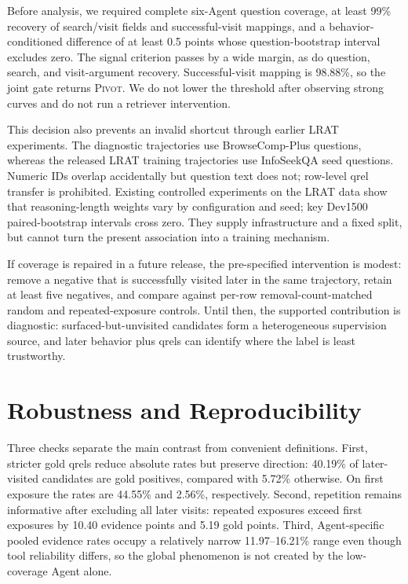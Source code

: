 Before analysis, we required complete six-Agent question coverage, at least 99\% recovery of search/visit fields and successful-visit mappings, and a behavior-conditioned difference of at least 0.5 points whose question-bootstrap interval excludes zero. The signal criterion passes by a wide margin, as do question, search, and visit-argument recovery. Successful-visit mapping is 98.88\%, so the joint gate returns \textsc{Pivot}. We do not lower the threshold after observing strong curves and do not run a retriever intervention.

This decision also prevents an invalid shortcut through earlier LRAT experiments. The diagnostic trajectories use BrowseComp-Plus questions, whereas the released LRAT training trajectories use InfoSeekQA seed questions. Numeric IDs overlap accidentally but question text does not; row-level qrel transfer is prohibited. Existing controlled experiments on the LRAT data show that reasoning-length weights vary by configuration and seed; key Dev1500 paired-bootstrap intervals cross zero. They supply infrastructure and a fixed split, but cannot turn the present association into a training mechanism.

If coverage is repaired in a future release, the pre-specified intervention is modest: remove a negative that is successfully visited later in the same trajectory, retain at least five negatives, and compare against per-row removal-count-matched random and repeated-exposure controls. Until then, the supported contribution is diagnostic: surfaced-but-unvisited candidates form a heterogeneous supervision source, and later behavior plus qrels can identify where the label is least trustworthy.

\section{Robustness and Reproducibility}

Three checks separate the main contrast from convenient definitions. First, stricter gold qrels reduce absolute rates but preserve direction: 40.19\% of later-visited candidates are gold positives, compared with 5.72\% otherwise. On first exposure the rates are 44.55\% and 2.56\%, respectively. Second, repetition remains informative after excluding all later visits: repeated exposures exceed first exposures by 10.40 evidence points and 5.19 gold points. Third, Agent-specific pooled evidence rates occupy a relatively narrow 11.97--16.21\% range even though tool reliability differs, so the global phenomenon is not created by the low-coverage Agent alone.

